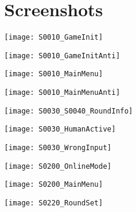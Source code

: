 \newpage
\section{Screenshots}
\label{appendix:screenshots}

\begin{center}
	\texttt{[image: S0010\_GameInit]}
	\label{figure:gameInit_true}
\end{center}
\begin{center}
	\texttt{[image: S0010\_GameInitAnti]}
	\label{figure:gameInit_false}
\end{center}
\begin{center}
	\texttt{[image: S0010\_MainMenu]}
	\label{figure:mainMenu_true}
\end{center}
\begin{center}
	\texttt{[image: S0010\_MainMenuAnti]}
	\label{figure:mainMenu_false}
\end{center}
\begin{center}
	\texttt{[image: S0030\_S0040\_RoundInfo]}
	\label{figure:cmd_winner}
\end{center}
\begin{center}
	\texttt{[image: S0030\_HumanActive]}
	\label{figure:cmd_play}
\end{center}
\begin{center}
	\texttt{[image: S0030\_WrongInput]}
	\label{figure:falseInput}
\end{center}
\begin{center}
	\texttt{[image: S0200\_OnlineMode]}
	\label{figure:onlineMode}
\end{center}
\begin{center}
	\texttt{[image: S0200\_MainMenu]}
	\label{figure:online_menu}
\end{center}
\begin{center}
	\texttt{[image: S0220\_RoundSet]}
	\label{figure:readyStart}
\end{center}
